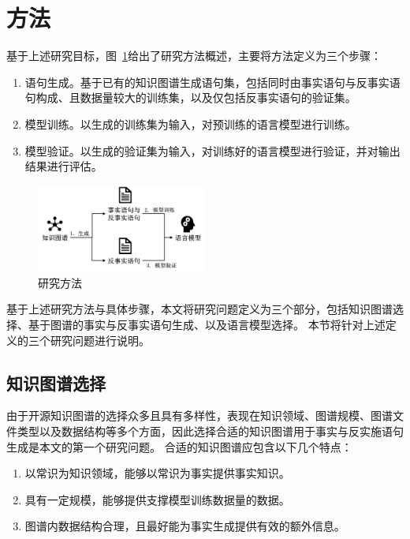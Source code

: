 \section{方法}
基于上述研究目标，图~\ref{fig:研究方法}给出了研究方法概述，主要将方法定义为三个步骤：

\begin{enumerate}
    \item 语句生成。基于已有的知识图谱生成语句集，包括同时由事实语句与反事实语句构成、且数据量较大的训练集，以及仅包括反事实语句的验证集。
    \item 模型训练。以生成的训练集为输入，对预训练的语言模型进行训练。
    \item 模型验证。以生成的验证集为输入，对训练好的语言模型进行验证，并对输出结果进行评估。
\end{enumerate}

\begin{figure}[htb]
    \centering
    \includegraphics[width=0.5\textwidth]{images/研究方法.png}
    \caption[研究方法]{研究方法}
    \label{fig:研究方法}
\end{figure}

基于上述研究方法与具体步骤，本文将研究问题定义为三个部分，包括知识图谱选择、基于图谱的事实与反事实语句生成、以及语言模型选择。
本节将针对上述定义的三个研究问题进行说明。

\subsection{知识图谱选择}
由于开源知识图谱的选择众多且具有多样性，表现在知识领域、图谱规模、图谱文件类型以及数据结构等多个方面，因此选择合适的知识图谱用于事实与反实施语句生成是本文的第一个研究问题。
合适的知识图谱应包含以下几个特点：
\begin{enumerate}
    \item 以常识为知识领域，能够以常识为事实提供事实知识。
    \item 具有一定规模，能够提供支撑模型训练数据量的数据。
    \item 图谱内数据结构合理，且最好能为事实生成提供有效的额外信息。
\end{enumerate}


